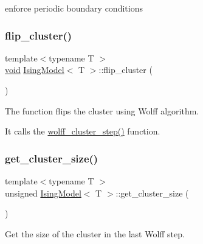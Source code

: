 enforce periodic boundary conditions 

\mbox{\label{classIsingModel_ab76a4eee808eaa1979ff6707498e9908}} 
\subsubsection{\texorpdfstring{flip\+\_\+cluster()}{flip\_cluster()}}
{\footnotesize\ttfamily template$<$typename T $>$ \\
\mbox{\hyperlink{glad_8h_a950fc91edb4504f62f1c577bf4727c29}{void}} \mbox{\hyperlink{classIsingModel}{Ising\+Model}}$<$ T $>$\+::flip\+\_\+cluster (\begin{DoxyParamCaption}{ }\end{DoxyParamCaption})\hspace{0.3cm}{\ttfamily [inline]}}



The function flips the cluster using Wolff algorithm. 

It calls the \mbox{\hyperlink{classIsingModel_a37758a1a4a2536d16f1bb8166e13f7b6}{wolff\+\_\+cluster\+\_\+step()}} function. \mbox{\label{classIsingModel_afd731e5858b03deb1c8a11ee8a6b8834}} 
\subsubsection{\texorpdfstring{get\+\_\+cluster\+\_\+size()}{get\_cluster\_size()}}
{\footnotesize\ttfamily template$<$typename T $>$ \\
unsigned \mbox{\hyperlink{classIsingModel}{Ising\+Model}}$<$ T $>$\+::get\+\_\+cluster\+\_\+size (\begin{DoxyParamCaption}{ }\end{DoxyParamCaption})\hspace{0.3cm}{\ttfamily [inline]}}



Get the size of the cluster in the last Wolff step. 

\mbox{\label{classIsingModel_a37a7c509999f21f1bd4f54a12009f3cf}} 
